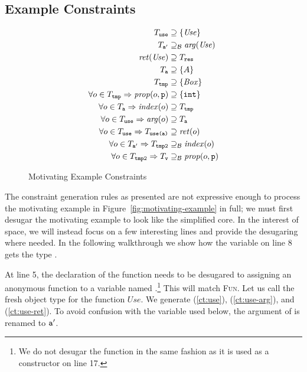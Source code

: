 \subsection{Example Constraints}
\label{sec:example-constraints}

\begin{figure}
\begin{align}
T_{\texttt{use}} & \supseteq \{\mathit{Use}\}\label{ct:use}\\
T_{\texttt{a}'} & \supseteq_\mathcal{B} \mathit{arg}(\mathit{Use})\label{ct:use-arg}\\
\mathit{ret}(\mathit{Use}) & \supseteq T_{\texttt{res}}\label{ct:use-ret}\\
T_{\texttt{a}} & \supseteq \{A\} \label{ct:1}\\
T_{\texttt{tmp}} & \supseteq \{\mathit{Box}\} \label{ct:2}\\
\forall o \in T_{\texttt{tmp}} \Rightarrow \mathit{prop}(o, \texttt{p}) & \supseteq \{\texttt{int}\} \label{ct:3}\\
\forall o \in T_{\texttt{a}} \Rightarrow \mathit{index}(o) & \supseteq T_{\texttt{tmp}} \label{ct:5}\\
\forall o \in T_{\texttt{use}} \Rightarrow \mathit{arg}(o) & \supseteq T_{\texttt{a}}\label{ct:6}\\
\forall o \in T_{\texttt{use}} \Rightarrow T_{\texttt{use(a)}} & \supseteq \mathit{ret}(o)\label{ct:7}\\
\forall o \in T_{\texttt{a}'} \Rightarrow T_{\texttt{tmp2}} & \supseteq_\mathcal{B} \mathit{index}(o)\label{ct:8}\\
\forall o \in T_{\texttt{tmp2}} \Rightarrow T_{\texttt{v}} & \supseteq_\mathcal{B} \mathit{prop}(o, \texttt{p})\label{ct:9}
\end{align}
\caption{Motivating Example Constraints}
\label{fig:example-constraints}
\end{figure}

The constraint generation rules as presented are not expressive enough to
process the motivating example in Figure~\ref{fig:motivating-example} in full;
we must first desugar the motivating example to look like the simplified
core. In the interest of space, we will instead focus on a few interesting
lines and provide the desugaring where needed. In the following walkthrough we
show how the variable  on line 8 gets the type .

At line 5, the declaration of the  function needs to be desugared to
assigning an anonymous function to a variable named .\footnote{We do
  not desugar the  function in the same fashion as it is used as a
  constructor on line 17.} This will match \textsc{Fun}. Let us call the fresh
object type for the function $\mathit{Use}$. We generate (\ref{ct:use}),
(\ref{ct:use-arg}), and (\ref{ct:use-ret}). To avoid confusion with the
variable  used below, the argument of  is renamed to
$\texttt{a}'$.

